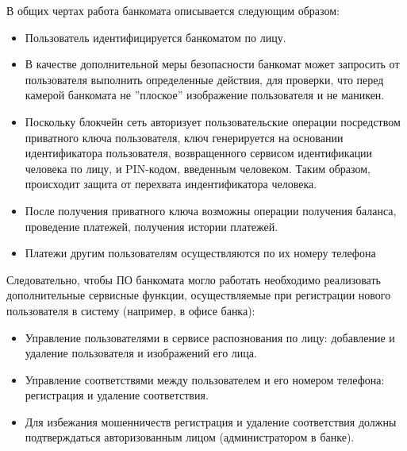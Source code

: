 В общих чертах работа банкомата описывается следующим образом:
\begin{itemize}
  \item Пользователь идентифицируется банкоматом по лицу.
  \item В качестве дополнительной меры безопасности банкомат может запросить от пользователя выполнить определенные действия, для проверки, что перед камерой банкомата не ''плоское'' изображение пользователя и не маникен.
  \item Поскольку блокчейн сеть авторизует пользовательские операции посредством приватного ключа пользователя, ключ генерируется на основании идентификатора пользователя, возвращенного сервисом идентификации человека по лицу, и PIN-кодом, введенным человеком. Таким образом, происходит защита от перехвата индентификатора человека.
  \item После получения приватного ключа возможны операции получения баланса, проведение платежей, получения истории платежей.
  \item Платежи другим пользователям осуществляются по их номеру телефона  
\end{itemize}

Следовательно, чтобы ПО банкомата могло работать необходимо реализовать дополнительные сервисные функции, осуществляемые при регистрации нового пользователя в систему (например, в офисе банка):
\begin{itemize}
  \item Управление пользователями в сервисе распознования по лицу: добавление и удаление пользователя и изображений его лица.
  \item Управление соответствями между пользователем и его номером телефона: регистрация и удаление соответствия.
  \item Для избежания мошенничеств регистрация и удаление соответствия должны подтверждаться авторизованным лицом (администратором в банке).
\end{itemize}
